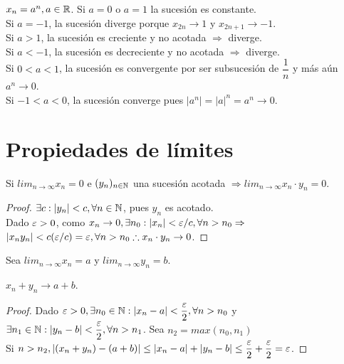 \begin{eg}
  $x_n = a^n, a \in \mathbb{R}$. Si $a=0$ o $a = 1$ la sucesión es constante. \\
  Si $a = -1$, la sucesión diverge porque $x_{2n} \to 1$ y $x_{2n+1} \to -1$. \\
  Si $a > 1$, la sucesión es creciente y no acotada $\Rightarrow$ diverge. \\
  Si $a < -1$, la sucesión es decreciente y no acotada $\Rightarrow$ diverge. \\
  Si $0 < a < 1$, la sucesión es convergente por ser subsucesión de $\dfrac{1}{n}$ y más aún $a^n \to 0$. \\
  Si $-1 < a < 0$, la sucesión converge pues $|a^n| = |a|^n = a^n \to 0$.
\end{eg}

\clearpage

\section{Propiedades de límites}

\begin{theorem}
  Si $lim_{n \to \infty} x_n = 0$ e $(y_n)_{n \in \mathbb{N}}$ una sucesión acotada $\Rightarrow lim_{n \to \infty} x_n \cdot y_n = 0$.
  \begin{proof}
    $\exists c : |y_n| < c, \forall n \in \mathbb{N}$, pues $y_n$ es acotado. \\
    Dado $\varepsilon > 0$, como $x_n \to 0, \exists n_0 : |x_n| < \varepsilon/c, \forall n > n_0 \Rightarrow$ \\
    $|x_n y_n| < c (\varepsilon/c) = \varepsilon, \forall n > n_0 \therefore x_n \cdot y_n \to 0$.
  \end{proof}
\end{theorem}

Sea $lim_{n \to \infty} x_n = a$ y $lim_{n \to \infty} y_n = b$.

\begin{prop}
  $x_n + y_n \to a+b$.
  \begin{proof}
    Dado $\varepsilon > 0, \exists n_0 \in \mathbb{N} : |x_n - a| < \dfrac{\varepsilon}{2}, \forall n > n_0$ y \\ $\exists n_1 \in \mathbb{N} : |y_n - b| < \dfrac{\varepsilon}{2}, \forall n > n_1$.
    Sea $n_2 = max(n_0, n_1)$ \\
    Si $n > n_2, |(x_n + y_n)-(a + b)| \leq |x_n - a| + |y_n - b| \leq \dfrac{\varepsilon}{2} + \dfrac{\varepsilon}{2} = \varepsilon$.
  \end{proof}
\end{prop}

